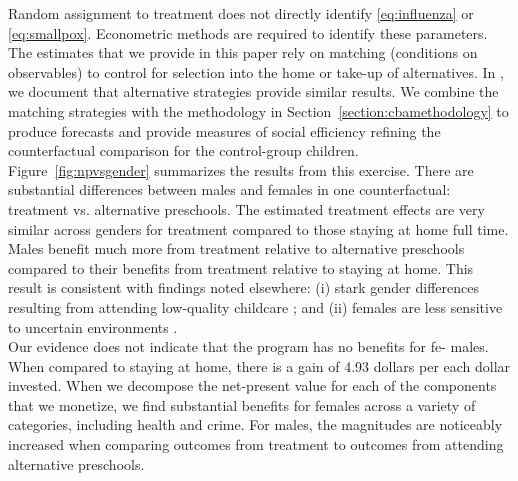 \noindent Random assignment to treatment does not directly identify \eqref{eq:influenza} or \eqref{eq:smallpox}. Econometric methods are required to identify these parameters. The estimates that we provide in this paper rely on matching (conditions on observables) to control for selection into the home or take-up of alternatives. In \citet{Garcia_Heckman_Ziff_2017_Gender-Diff_UNPUBLISHED}, we document that alternative strategies provide similar results. We combine the matching strategies with the methodology in Section~\ref{section:cbamethodology} to produce forecasts and provide measures of social efficiency refining the counterfactual comparison for the control-group children.\\

\noindent Figure~\ref{fig:npvsgender} summarizes the results from this exercise. There are substantial differences between males and females in one counterfactual: treatment vs. alternative preschools. The estimated treatment effects are very similar across genders for treatment compared to those staying at home full time. Males benefit much more from treatment relative to alternative preschools compared to their benefits from treatment relative to staying at home. This result is consistent with findings noted elsewhere: (i) stark gender differences resulting from attending low-quality childcare \citep{Kottelenberg_Lehrer_2014_Gender-Effects,Baker_Gruber_Milligan_2015_Noncog_Defects}; and (ii) females are less sensitive to uncertain environments \citep{Autor-etal_2015_Family-Disadvantage}.\\

\noindent Our evidence does not indicate that the program has no benefits for fe- males. When compared to staying at home, there is a gain of 4.93 dollars per each dollar invested. When we decompose the net-present value for each of the components that we monetize, we find substantial benefits for females across a variety of categories, including health and crime. For males, the magnitudes are noticeably increased when comparing outcomes from treatment to outcomes from attending alternative preschools.

